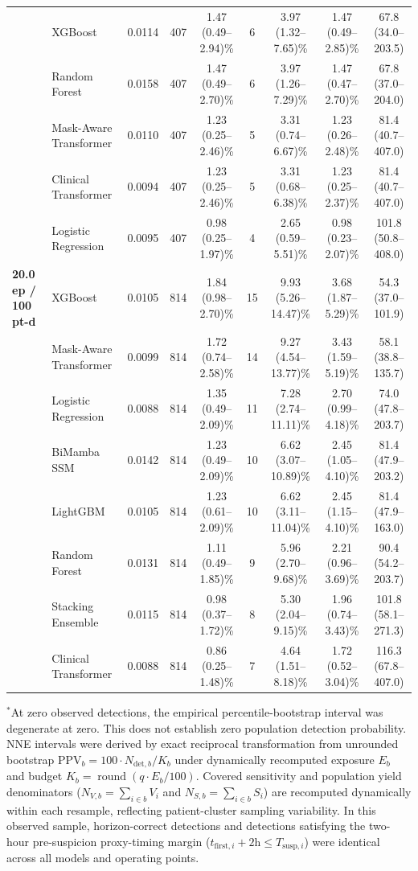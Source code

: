 \documentclass[10pt,twocolumn,a4paper]{article}
\begin{document}
\begin{table}[t]
\begin{tabular*}{\textwidth}{@{\extracolsep{\fill}}llccccccc@{}}
 & XGBoost & 0.0114 & 407 & 1.47 (0.49--2.94)\% & 6 & 3.97 (1.32--7.65)\% & 1.47 (0.49--2.85)\% & 67.8 (34.0--203.5) \\
 & Random Forest & 0.0158 & 407 & 1.47 (0.49--2.70)\% & 6 & 3.97 (1.26--7.29)\% & 1.47 (0.47--2.70)\% & 67.8 (37.0--204.0) \\
 & Mask-Aware Transformer & 0.0110 & 407 & 1.23 (0.25--2.46)\% & 5 & 3.31 (0.74--6.67)\% & 1.23 (0.26--2.48)\% & 81.4 (40.7--407.0) \\
 & Clinical Transformer & 0.0094 & 407 & 1.23 (0.25--2.46)\% & 5 & 3.31 (0.68--6.38)\% & 1.23 (0.25--2.37)\% & 81.4 (40.7--407.0) \\
 & Logistic Regression & 0.0095 & 407 & 0.98 (0.25--1.97)\% & 4 & 2.65 (0.59--5.51)\% & 0.98 (0.23--2.07)\% & 101.8 (50.8--408.0) \\
\midrule
\textbf{20.0 ep / 100 pt-d} & XGBoost & 0.0105 & 814 & 1.84 (0.98--2.70)\% & 15 & 9.93 (5.26--14.47)\% & 3.68 (1.87--5.29)\% & 54.3 (37.0--101.9) \\
 & Mask-Aware Transformer & 0.0099 & 814 & 1.72 (0.74--2.58)\% & 14 & 9.27 (4.54--13.77)\% & 3.43 (1.59--5.19)\% & 58.1 (38.8--135.7) \\
 & Logistic Regression & 0.0088 & 814 & 1.35 (0.49--2.09)\% & 11 & 7.28 (2.74--11.11)\% & 2.70 (0.99--4.18)\% & 74.0 (47.8--203.7) \\
 & BiMamba SSM & 0.0142 & 814 & 1.23 (0.49--2.09)\% & 10 & 6.62 (3.07--10.89)\% & 2.45 (1.05--4.10)\% & 81.4 (47.9--203.2) \\
 & LightGBM & 0.0105 & 814 & 1.23 (0.61--2.09)\% & 10 & 6.62 (3.11--11.04)\% & 2.45 (1.15--4.10)\% & 81.4 (47.9--163.0) \\
 & Random Forest & 0.0131 & 814 & 1.11 (0.49--1.85)\% & 9 & 5.96 (2.70--9.68)\% & 2.21 (0.96--3.69)\% & 90.4 (54.2--203.7) \\
 & Stacking Ensemble & 0.0115 & 814 & 0.98 (0.37--1.72)\% & 8 & 5.30 (2.04--9.15)\% & 1.96 (0.74--3.43)\% & 101.8 (58.1--271.3) \\
 & Clinical Transformer & 0.0088 & 814 & 0.86 (0.25--1.48)\% & 7 & 4.64 (1.51--8.18)\% & 1.72 (0.52--3.04)\% & 116.3 (67.8--407.0) \\
\bottomrule
\end{tabular*}
\vspace{0.2em}
\raggedright
\scriptsize
$^*$At zero observed detections, the empirical percentile-bootstrap interval was degenerate at zero. This does not establish zero population detection probability. NNE intervals were derived by exact reciprocal transformation from unrounded bootstrap $\text{PPV}_b = 100 \cdot N_{\text{det},b} / K_b$ under dynamically recomputed exposure $E_b$ and budget $K_b = \operatorname{round}(q \cdot E_b / 100)$. Covered sensitivity and population yield denominators ($N_{V,b} = \sum_{i \in b} V_i$ and $N_{S,b} = \sum_{i \in b} S_i$) are recomputed dynamically within each resample, reflecting patient-cluster sampling variability. In this observed sample, horizon-correct detections and detections satisfying the two-hour pre-suspicion proxy-timing margin ($t_{\mathrm{first}, i} + 2\text{h} \le T_{\mathrm{susp}, i}$) were identical across all models and operating points.

\end{table}
\end{document}
